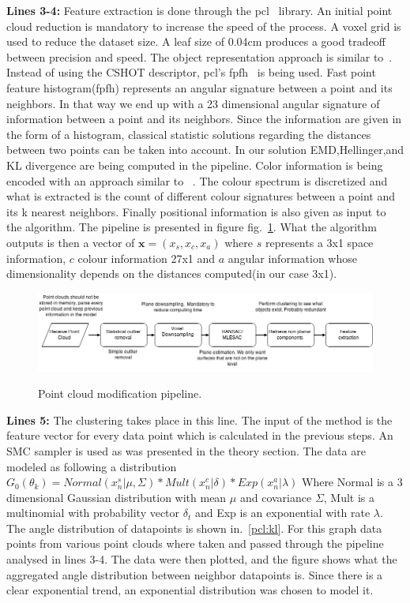 \documentclass[twoside,hidelinks]{article}
\begin{document}
\textbf{Lines 3-4:} Feature extraction is done through the pcl~\cite{pcl} library. An initial point cloud reduction is mandatory to increase the speed of the process. A voxel grid is used to reduce the dataset size. A leaf size of 0.04cm produces a good tradeoff between precision and speed. The object representation approach is similar to~\cite{objectpointslam}. Instead of using the CSHOT descriptor, pcl's fpfh~\cite{fpfh} is being used. Fast point feature histogram(fpfh) represents an angular signature between a point and its neighbors. In that way we end up with a 23 dimensional angular signature of information between a point and its neighbors. Since the information are given in the form of a histogram, classical statistic solutions regarding the distances between two points can be taken into account. In our solution EMD,Hellinger,and KL divergence are being computed in the pipeline. Color information is being encoded with an approach similar to ~\cite{smcddp}. The colour spectrum is discretized and what is extracted is the count of different colour signatures between a point and its k nearest neighbors. Finally positional information is also given as input to the algorithm. The pipeline is presented in figure fig.~\ref{pcl:mod}. What the algorithm outputs is then a vector of $ \textbf{x} = (x_s, x_c, x_a) $ where $s$ represents a 3x1 space information, $c$ colour information 27x1 and $a$ angular information whose dimensionality depends on the distances computed(in our case 3x1).

\begin{figure}[h!]
  \caption{Point cloud modification pipeline.}
  \centering
    \includegraphics[width=1\textwidth]{Basic}
  \label{pcl:mod}
\end{figure}

\textbf{Lines 5:} The clustering takes place in this line. The input of the method is the feature vector for every data point which is calculated in the previous steps. An SMC sampler is used as was presented in the theory section. The data are modeled as following a distribution $G_0(\theta_k) = Normal(x_n^s | \mu , \Sigma)* Mult(x_n^c| \delta) * Exp( x_n^a | \lambda) $ Where Normal is a 3 dimensional Gaussian distribution with mean $\mu$ and covariance $\Sigma$, Mult is a multinomial with probability vector $\delta_t$ and Exp is an exponential with rate $\lambda$. The angle distribution of datapoints is shown in.~\ref{pcl:kl}. For this graph data points from various point clouds where taken and passed through the pipeline analysed in lines 3-4. The data were then plotted, and the figure shows what the aggregated angle distribution between neighbor datapoints is. Since there is a clear exponential trend, an exponential distribution was chosen to model it.
\end{document}

